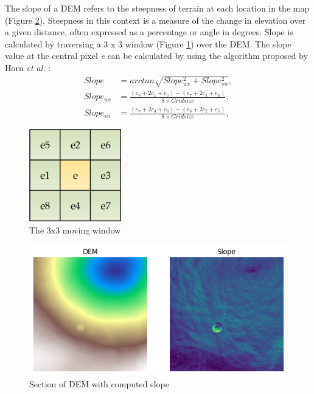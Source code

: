 \documentclass[twocolumn]{article}
\begin{document}
The slope of a DEM refers to the steepness of terrain at each location in the map (Figure \ref{fig:dem_and_slope}).
Steepness in this context is a measure of the change in elevation over a given distance, often expressed as a percentage or angle in degrees.
Slope is calculated by traversing a 3 x 3 window (Figure \ref{fig:window}) over the DEM\autocite{qiuVoidFillingDigital2019}.
The slope value at the central pixel \emph{e} can be calculated by using the algorithm proposed by Horn \emph{et al.}\autocite{hornHillShadingReflectance1981} :
\begin{align}
Slope &= arctan\sqrt{Slope^2_{we} + Slope^2_{sn}}, \\
Slope_{we} &= \frac{(e_8 + 2e_1 + e_5) - (e_7 + 2e_3 + e_6)}{8 \times Gridsize}, \\
Slope_{sn} &= \frac{(e_7 + 2e_4 + e_8) - (e_6 + 2e_2 + e_5)}{8 \times Gridsize},
\end{align}

\begin{figure}[htbp]
\centering
\includegraphics[width=4cm]{images/window.png}
\caption{\label{fig:window}The 3x3 moving window\autocite{qiuVoidFillingDigital2019}}
\end{figure}

\begin{figure}[htbp]
\centering
\includegraphics[width=.9\linewidth]{images/dem_and_slope.png}
\caption{\label{fig:dem_and_slope}Section of DEM with computed slope}
\end{figure}
\end{document}
